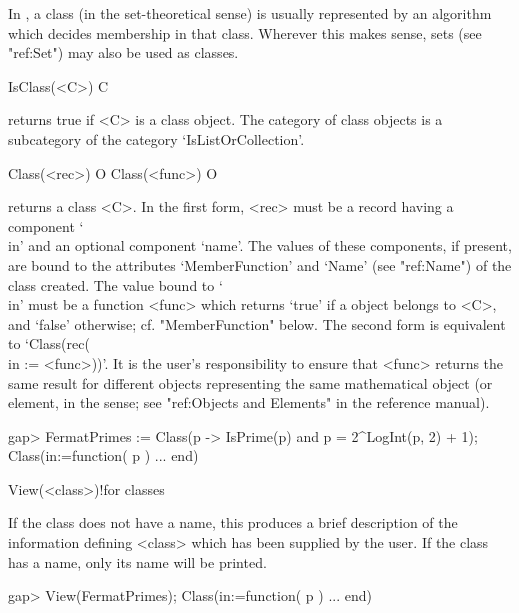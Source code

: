 
In {\CRISP}, a class (in the set-theoretical sense) is usually represented
by an algorithm which decides membership in that class. Wherever this makes
sense, sets (see "ref:Set") may also be used as classes.


\null


\>IsClass(<C>) C

returns true if <C> is a class object. The category of class objects is a
subcategory of the category `IsListOrCollection'.

\>Class(<rec>) O
\>Class(<func>) O

returns a class <C>. In the first form, <rec> must be a record having a
component `\\in' and an optional component `name'. The values of these
components, if present, are bound to the attributes `MemberFunction' and
`Name' (see "ref:Name") of the class created. The value bound to `\\in' must be a function
<func> which returns `true' if a {\GAP} object belongs to <C>, and `false'
otherwise; cf. "MemberFunction" below. The second form is equivalent to `Class(rec(\\in
:= <func>))'. It is the user's responsibility to ensure that <func> returns the same
result for different {\GAP} objects representing the same mathematical object (or
element, in the {\GAP} sense; see "ref:Objects and Elements" in the {\GAP}
reference manual).

\beginexample
gap> FermatPrimes := Class(p -> IsPrime(p) and p = 2^LogInt(p, 2) + 1); 
Class(in:=function( p ) ... end)
\endexample

\>View(<class>)!{for classes}

If the class does not have a name, this produces a brief description of the
information defining <class> which has been supplied by the user. If the
class has a name, only its name will be printed.

\begintt
gap> View(FermatPrimes);
Class(in:=function( p ) ... end)
\endtt

